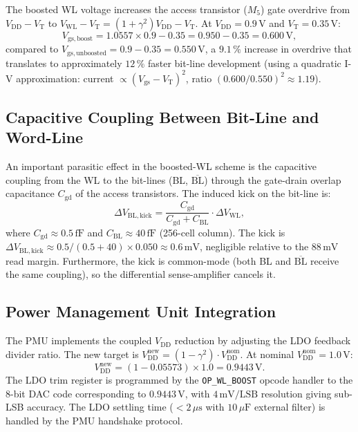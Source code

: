 The boosted WL voltage increases the access transistor ($M_5$) gate
overdrive from $V_{\mathrm{DD}} - V_{\mathrm{T}}$ to
$V_{\mathrm{WL}} - V_{\mathrm{T}} = (1+\gamma^{2})V_{\mathrm{DD}} - V_{\mathrm{T}}$.
At $V_{\mathrm{DD}} = 0.9\,\text{V}$ and $V_{\mathrm{T}} = 0.35\,\text{V}$:
\[
  V_{\mathrm{gs,boost}} = 1.0557 \times 0.9 - 0.35 = 0.950 - 0.35 = 0.600\,\text{V},
\]
compared to $V_{\mathrm{gs,unboosted}} = 0.9 - 0.35 = 0.550\,\text{V}$,
a $9.1\,\%$ increase in overdrive that translates to approximately
$12\,\%$ faster bit-line development (using a quadratic I-V
approximation: current $\propto (V_{\mathrm{gs}} - V_{\mathrm{T}})^{2}$,
ratio $(0.600/0.550)^{2} \approx 1.19$).

\subsection{Capacitive Coupling Between Bit-Line and Word-Line}

An important parasitic effect in the boosted-WL scheme is the
capacitive coupling from the WL to the bit-lines (BL, $\overline{\text{BL}}$)
through the gate-drain overlap capacitance $C_{\mathrm{gd}}$ of the
access transistors.  The induced kick on the bit-line is:
\[
  \Delta V_{\mathrm{BL,kick}}
  = \frac{C_{\mathrm{gd}}}{C_{\mathrm{gd}} + C_{\mathrm{BL}}} \cdot \Delta V_{\mathrm{WL}},
\]
where $C_{\mathrm{gd}} \approx 0.5\,\text{fF}$ and
$C_{\mathrm{BL}} \approx 40\,\text{fF}$ (256-cell column).
The kick is $\Delta V_{\mathrm{BL,kick}} \approx 0.5/(0.5+40)
\times 0.050 \approx 0.6\,\text{mV}$, negligible relative to the
$88\,\text{mV}$ read margin.  Furthermore, the kick is common-mode
(both BL and $\overline{\text{BL}}$ receive the same coupling), so
the differential sense-amplifier cancels it.

\subsection{Power Management Unit Integration}

The PMU implements the coupled $V_{\mathrm{DD}}$ reduction by
adjusting the LDO feedback divider ratio.  The new target is
$V_{\mathrm{DD}}^{\mathrm{new}} = (1-\gamma^{2}) \cdot V_{\mathrm{DD}}^{\mathrm{nom}}$.
At nominal $V_{\mathrm{DD}}^{\mathrm{nom}} = 1.0\,\text{V}$:
\[
  V_{\mathrm{DD}}^{\mathrm{new}} = (1 - 0.05573) \times 1.0 = 0.9443\,\text{V}.
\]
The LDO trim register is programmed by the \texttt{OP\_WL\_BOOST}
opcode handler to the 8-bit DAC code corresponding to $0.9443\,\text{V}$,
with $4\,\text{mV/LSB}$ resolution giving sub-LSB accuracy.
The LDO settling time ($< 2\,\mu\text{s}$ with $10\,\mu\text{F}$
external filter) is handled by the PMU handshake protocol.

